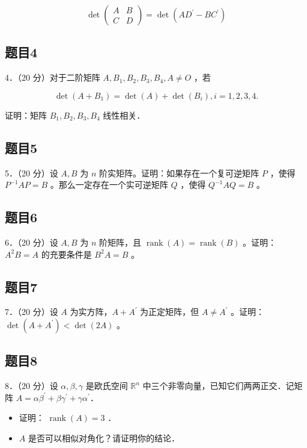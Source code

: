 \documentclass{article}
\begin{document}
\[
\operatorname{det}\left(\begin{array}{ll}
A & B \\
C & D
\end{array}\right)=\operatorname{det}\left(A D^{\prime}-B C^{\prime}\right)
\]

\subsection{题目4}
4．（20 分）对于二阶矩阵 \(A, B_{1}, B_{2}, B_{3}, B_{4}, A \neq O\) ，若

\[
\operatorname{det}\left(A+B_{1}\right)=\operatorname{det}(A)+\operatorname{det}\left(B_{i}\right), i=1,2,3,4 .
\]

证明：矩阵 \(B_{1}, B_{2}, B_{3}, B_{4}\) 线性相关．

\subsection{题目5}
5．（20 分）设 \(A, B\) 为 \(n\) 阶实矩阵。证明：如果存在一个复可逆矩阵 \(P\) ，使得 \(P^{-1} A P=B\) 。那么一定存在一个实可逆矩阵 \(Q\) ，使得 \(Q^{-1} A Q=B\) 。

\subsection{题目6}
6．（20 分）设 \(A, B\) 为 \(n\) 阶矩阵，且 \(\operatorname{rank}(A)=\operatorname{rank}(B)\) 。证明：\(A^{2} B=A\) 的充要条件是 \(B^{2} A=B\) 。

\subsection{题目7}
7．（20 分）设 \(A\) 为实方阵，\(A+A^{\prime}\) 为正定矩阵，但 \(A \neq A^{\prime}\) 。证明： \(\operatorname{det}\left(A+A^{\prime}\right)<\operatorname{det}(2 A)\) 。

\subsection{题目8}
8．（20 分）设 \(\alpha, \beta, \gamma\) 是欧氏空间 \(\mathbb{R}^{n}\) 中三个非零向量，已知它们两两正交．记矩阵 \(A=\alpha \beta^{\prime}+\beta \gamma^{\prime}+\gamma \alpha^{\prime}\)．

\begin{itemize}
  \item[（1）] 证明： \(\operatorname{rank}(A)=3\) ．
  \item[（2）] \(A\) 是否可以相似对角化？请证明你的结论．
\end{itemize}
\end{document}
